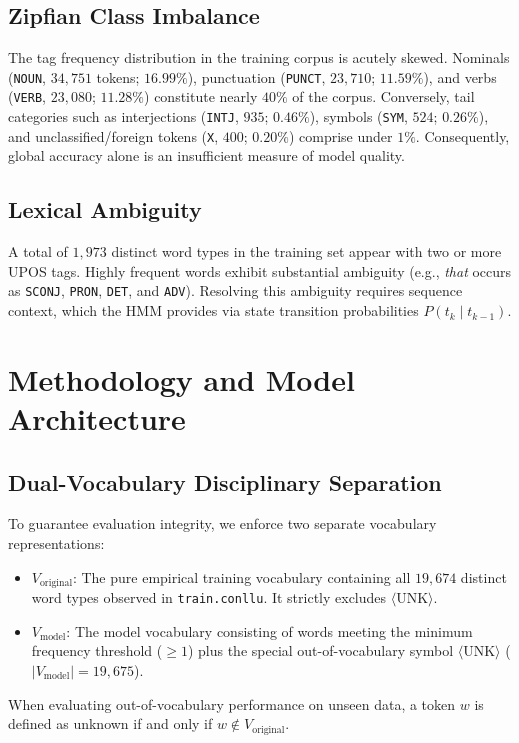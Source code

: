 \documentclass[conference]{IEEEtran}
\begin{document}
\subsection{Zipfian Class Imbalance}
The tag frequency distribution in the training corpus is acutely skewed. Nominals (\texttt{NOUN}, $34,751$ tokens; $16.99\%$), punctuation (\texttt{PUNCT}, $23,710$; $11.59\%$), and verbs (\texttt{VERB}, $23,080$; $11.28\%$) constitute nearly $40\%$ of the corpus. Conversely, tail categories such as interjections (\texttt{INTJ}, $935$; $0.46\%$), symbols (\texttt{SYM}, $524$; $0.26\%$), and unclassified/foreign tokens (\texttt{X}, $400$; $0.20\%$) comprise under $1\%$. Consequently, global accuracy alone is an insufficient measure of model quality.

\subsection{Lexical Ambiguity}
A total of $1,973$ distinct word types in the training set appear with two or more UPOS tags. Highly frequent words exhibit substantial ambiguity (e.g., \textit{that} occurs as \texttt{SCONJ}, \texttt{PRON}, \texttt{DET}, and \texttt{ADV}). Resolving this ambiguity requires sequence context, which the HMM provides via state transition probabilities $P(t_k \mid t_{k-1})$.

\section{Methodology and Model Architecture}
\label{sec:methodology}

\subsection{Dual-Vocabulary Disciplinary Separation}
To guarantee evaluation integrity, we enforce two separate vocabulary representations:
\begin{itemize}
    \item $V_{\text{original}}$: The pure empirical training vocabulary containing all $19,674$ distinct word types observed in \texttt{train.conllu}. It strictly excludes $\langle\text{UNK}\rangle$.
    \item $V_{\text{model}}$: The model vocabulary consisting of words meeting the minimum frequency threshold ($\ge 1$) plus the special out-of-vocabulary symbol $\langle\text{UNK}\rangle$ ($|V_{\text{model}}| = 19,675$).
\end{itemize}
When evaluating out-of-vocabulary performance on unseen data, a token $w$ is defined as unknown if and only if $w \notin V_{\text{original}}$.
\end{document}
